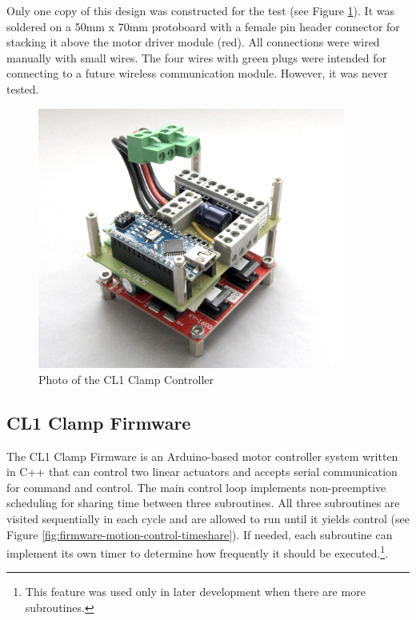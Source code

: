 Only one copy of this design was constructed for the test (see Figure \ref{fig:photo-cl1-controller}). It was soldered on a 50mm x 70mm protoboard with a female pin header connector for stacking it above the motor driver module (red). All connections were wired manually with small wires. The four wires with green plugs were intended for connecting to a future wireless communication module. However, it was never tested.

\begin{figure}
    \centering
    \includegraphics[width=0.90\textwidth]{images/04-3/controller-Photo-NoRadio.jpg}
    \caption{Photo of the CL1 Clamp Controller}
    \label{fig:photo-cl1-controller}
\end{figure}

\FloatBarrier

\subsection{CL1 Clamp Firmware}
\label{subsection:exploration-1-cl1-firmware}

The CL1 Clamp Firmware is an Arduino-based motor controller system written in C++ that can control two linear actuators and accepts serial communication for command and control. The main control loop implements non-preemptive scheduling for sharing time between three subroutines. All three subroutines are visited sequentially in each cycle and are allowed to run until it yields control (see Figure \ref{fig:firmware-motion-control-timeshare}). If needed, each subroutine can implement its own timer to determine how frequently it should be executed.\footnote{This feature was used only in later development when there are more subroutines.}.

